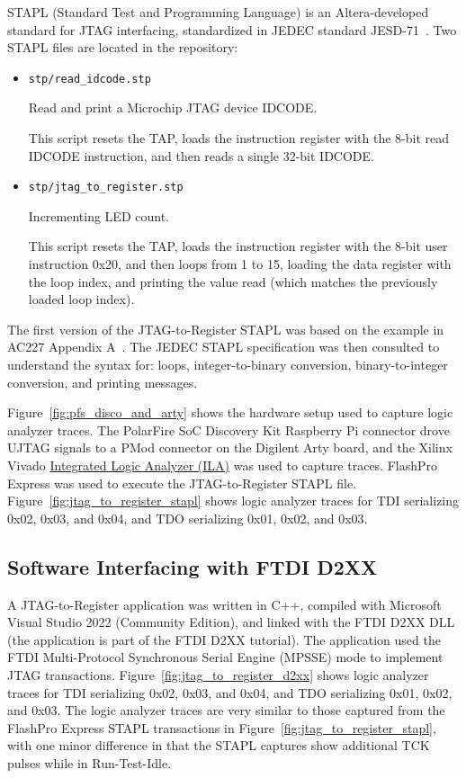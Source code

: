 STAPL (Standard Test and Programming Language) is an Altera-developed standard
for JTAG interfacing, standardized in JEDEC standard
JESD-71~\cite{JEDEC_JESD71_1999}.
%
Two STAPL files are located in the repository:
%
\begin{itemize}
\item \verb+stp/read_idcode.stp+

Read and print a Microchip JTAG device IDCODE.

This script resets the TAP, loads the instruction register with the 8-bit
read IDCODE instruction, and then reads a single 32-bit IDCODE.

\item \verb+stp/jtag_to_register.stp+

Incrementing LED count.

This script resets the TAP, loads the instruction register with the 8-bit
user instruction 0x20, and then loops from 1 to 15, loading the data register
with the loop index, and printing the value read (which matches the previously
loaded loop index).

\end{itemize}
%
The first version of the JTAG-to-Register STAPL was based on the example in
AC227 Appendix A~\cite{Microchip_AC227_2015}. The JEDEC STAPL specification
was then consulted to understand the syntax for: loops, integer-to-binary
conversion, binary-to-integer conversion, and printing messages.

Figure~\ref{fig:pfs_disco_and_arty} shows the hardware setup used to
capture logic analyzer traces. The PolarFire SoC Discovery Kit Raspberry
Pi connector drove UJTAG signals to a PMod connector on the
Digilent Arty board, and the Xilinx Vivado
\href{https://www.xilinx.com/products/intellectual-property/ila.html}
{Integrated Logic Analyzer (ILA)} was used to capture traces.
%
FlashPro Express was used to execute the JTAG-to-Register STAPL file.
Figure~\ref{fig:jtag_to_register_stapl} shows logic analyzer traces for
TDI serializing 0x02, 0x03, and 0x04, and TDO serializing 0x01, 0x02, and
0x03.

\clearpage
\subsection{Software Interfacing with FTDI D2XX}

A JTAG-to-Register application was written in C++, compiled with Microsoft
Visual Studio 2022 (Community Edition), and linked with the FTDI D2XX DLL
(the application is part of the FTDI D2XX tutorial).
%
The application used the FTDI Multi-Protocol Synchronous Serial Engine
(MPSSE) mode to implement JTAG transactions.
%
Figure~\ref{fig:jtag_to_register_d2xx} shows logic analyzer traces for
TDI serializing 0x02, 0x03, and 0x04, and TDO serializing 0x01, 0x02, and
0x03. The logic analyzer traces are very similar to those captured from the
FlashPro Express STAPL transactions in
Figure~\ref{fig:jtag_to_register_stapl}, with one minor difference in
that the STAPL captures show additional TCK pulses while in Run-Test-Idle.

